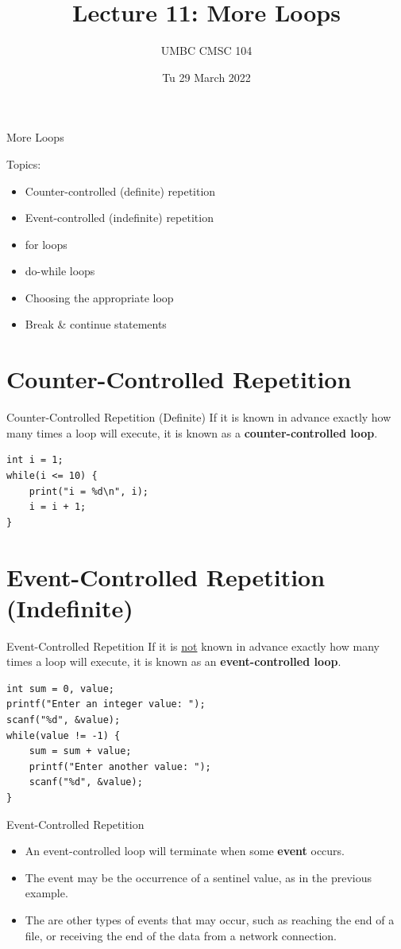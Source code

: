 \documentclass[graphics]{beamer}
\title{Lecture 11: More Loops}
\author{UMBC CMSC 104}
\date{Tu 29 March 2022}
\begin{document}
\begin{frame}{}
\centering
    More Loops
\end{frame}

\begin{frame}
    Topics:
    \begin{itemize}
        \item Counter-controlled (definite) repetition
        \item Event-controlled (indefinite) repetition
        \item for loops
        \item do-while loops
        \item Choosing the appropriate loop
        \item Break \& continue statements
    \end{itemize}
\end{frame}

\section*{Counter-Controlled Repetition}
\begin{frame}[fragile]{Counter-Controlled Repetition (Definite)}
    If it is known in advance exactly how many times a loop will execute, it is known as a \textbf{counter-controlled loop}.
    \begin{verbatim}
int i = 1;
while(i <= 10) {
    print("i = %d\n", i);
    i = i + 1;
}
    \end{verbatim}
\end{frame}

    \section*{Event-Controlled Repetition (Indefinite)}
\begin{frame}[fragile]{Event-Controlled Repetition}
    If it is \underline{not} known in advance exactly how many times a loop will execute, it is known as an \textbf{event-controlled loop}.
    \begin{verbatim}
int sum = 0, value;
printf("Enter an integer value: ");
scanf("%d", &value);
while(value != -1) {
    sum = sum + value;
    printf("Enter another value: ");
    scanf("%d", &value);
}
    \end{verbatim}
\end{frame}

\begin{frame}{Event-Controlled Repetition}
    \begin{itemize}
        \item An event-controlled loop will terminate when some \textbf{event} occurs.
        \item The event may be the occurrence of a sentinel value, as in the previous example.
        \item The are other types of events that may occur, such as reaching the end of a file, or receiving the end of the data from a network connection.
    \end{itemize}
\end{frame}
\end{document}
